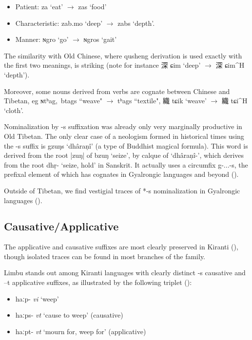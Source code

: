 \documentclass[oldfontcommands,oneside,a4paper,11pt]{article}
\newcommand{\ipa}[1]{{\phon \mbox{#1}}} %
\newcommand{\zh}[1]{{\cn #1}}
\newcommand{\ch}[3]{\zh{#1} \ipa{#2} `#3'}
\begin{document}
\begin{itemize}
\item Patient: \ipa{za} `eat' $\rightarrow$ \ipa{zas} `food' 
\item Characteristic: \ipa{zab.mo} `deep'  $\rightarrow$ \ipa{zabs} `depth'.
\item Manner: \ipa{ɴgro} `go'  $\rightarrow$ \ipa{ɴgros} `gait' 
 \end{itemize}

The similarity with Old Chinese, where qusheng derivation is used exactly with the first two meanings, is striking (note for instance \ch{深}{ɕim}{deep} $\rightarrow$ \ch{深}{ɕim^H}{depth}).

Moreover, some nouns derived from verbs are cognate between Chinese and Tibetan, eg \ipa{ɴtʰag, btags} ``weave" $\rightarrow$ \ipa{tʰags} ``textile", \ch{織}{tɕik}{weave} $\rightarrow$ \ch{織}{tɕi^H}{cloth}.

Nominalization by \ipa{-s} suffixation was already only very marginally productive in Old Tibetan. The only clear case of a neologism formed in historical times using the \ipa{-s} suffix is \ipa{gzuŋs} `dhâraṇî' (a type of Buddhist magical formula). This word is derived from the root \ipa{|zuŋ|} of \ipa{bzuŋ} `seize', by calque of `dhâraṇî-', which derives from the root dhṛ- `seize, hold' in Sanskrit. It actually uses a circumfix \ipa{g-...-s}, the prefixal element of which has cognates in Gyalrongic languages and beyond (\citealt{konnerth09nmlz, jacques14snom}).

Outside of Tibetan, we find vestigial traces of *\ipa{-s} nominalization in Gyalrongic languages (\citealt{jacques03s.houzhui, jackson14morpho}).

 \subsection{Causative/Applicative} \label{sec:causative}
The applicative and causative suffixes are most clearly preserved in Kiranti (\citealt{michailovsky85dental, jacques15derivational.khaling}), though isolated traces can be found in most branches of the family.

Limbu stands out among Kiranti languages with clearly distinct \ipa{-s} causative and \ipa{--t} applicative suffixes, as illustrated by the following triplet (\citealt{michailovsky02dico}):
\begin{itemize}
\item \ipa{haːp-} \textit{vi} `weep'
\item \ipa{haːps-} \textit{vt} `cause to weep' (causative)
\item \ipa{haːpt-} \textit{vt} `mourn for, weep for' (applicative)
\end{itemize}
\end{document}
